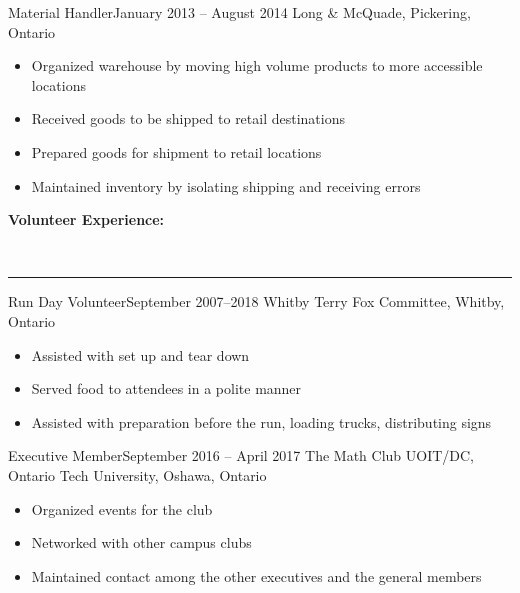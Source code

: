 \documentclass[]{article}
\makeatletter
\newcommand{\heading}[1]
{\begin{large}\textbf{#1}\end{large}\\%
 \noindent\rule[1.2ex]{\linewidth+0.40cm}{0.4pt}}
\newenvironment{*subsection}[2]
{
\begin{tabu} to \linewidth {@{}X[l] r}
  \textbf{#1} &
  \textbf{#2}
\end{tabu}
}
{
  \vspace{3mm}
}
\makeatother
\begin{document}
\pagebreak{}
\begin{*subsection}{Material Handler}{January 2013 -- August 2014}
%
Long \& McQuade, Pickering, Ontario
%
\begin{itemize}
\item
  Organized warehouse by moving high volume products to more
  accessible locations
\item
  Received goods to be shipped to retail destinations
\item
  Prepared goods for shipment to retail locations
\item
  Maintained inventory by isolating shipping and receiving errors
\end{itemize}
\end{*subsection}
\heading{Volunteer Experience:}
\begin{*subsection}{Run Day Volunteer}{September 2007--2018}
%
Whitby Terry Fox Committee, Whitby, Ontario
%
\begin{itemize}
\item
  Assisted with set up and tear down
\item
  Served food to attendees in a polite manner
\item
  Assisted with preparation before the run, loading trucks,
  distributing signs
\end{itemize}
\end{*subsection}
\begin{*subsection}{Executive Member}{September 2016 -- April 2017}
%
The Math Club UOIT/DC, Ontario Tech University, Oshawa, Ontario
%
\begin{itemize}
\item
  Organized events for the club
\item
  Networked with other campus clubs
\item
  Maintained contact among the other executives and the general members
\end{itemize}
\end{*subsection}
\end{document}

